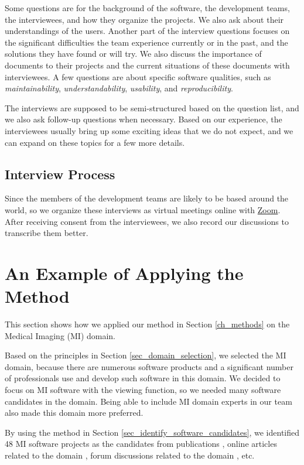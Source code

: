 Some questions are for the background of the software, the development teams, the interviewees, and how they organize the projects. We also ask about their understandings of the users. Another part of the interview questions focuses on the significant difficulties the team experience currently or in the past, and the solutions they have found or will try. We also discuss the importance of documents to their projects and the current situations of these documents with interviewees. A few questions are about specific software qualities, such as \textit{maintainability}, \textit{understandability}, \textit{usability}, and \textit{reproducibility}.

The interviews are supposed to be semi-structured based on the question list, and we also ask follow-up questions when necessary. Based on our experience, the interviewees usually bring up some exciting ideas that we do not expect, and we can expand on these topics for a few more details.

\subsection{Interview Process}
Since the members of the development teams are likely to be based around the world, so we organize these interviews as virtual meetings online with \hyperlink{https://zoom.us/}{Zoom}. After receiving consent from the interviewees, we also record our discussions to transcribe them better.

\section{An Example of Applying the Method}
\label{sec_applying_method}

This section shows how we applied our method in Section \ref{ch_methods} on the Medical Imaging (MI) domain.

Based on the principles in Section \ref{sec_domain_selection}, we selected the MI domain, because there are numerous software products and a significant number of professionals use and develop such software in this domain. We decided to focus on MI software with the viewing function, so we needed many software candidates in the domain. Being able to include MI domain experts in our team also made this domain more preferred.

By using the method in Section \ref{sec_identify_software_candidates}, we identified 48 MI software projects as the candidates from publications \cite{Bjorn2017} \cite{Bruhschwein2019} \cite{Haak2015}, online articles related to the domain \cite{Emms2019} \cite{Hasan2020} \cite{Mu2019}, forum discussions related to the domain \cite{Samala2014}, etc.

